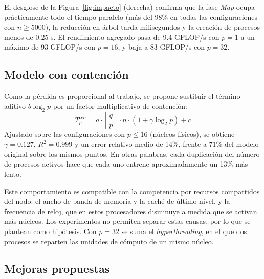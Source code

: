 \documentclass[11pt, a4paper]{article}
\begin{document}
El desglose de la Figura~\ref{fig:impacto} (derecha) confirma que la fase \textit{Map} ocupa prácticamente todo el tiempo paralelo (más del 98\% en todas las configuraciones con $n \geq 5000$), la reducción en árbol tarda milisegundos y la creación de procesos menos de 0.25 s. El rendimiento agregado pasa de 9.4 GFLOP/s con $p = 1$ a un máximo de 93 GFLOP/s con $p = 16$, y baja a 83 GFLOP/s con $p = 32$.

\subsection{Modelo con contención}

Como la pérdida es proporcional al trabajo, se propone sustituir el término aditivo $b \log_2 p$ por un factor multiplicativo de contención:
$$T_p^{teo} = a \cdot \left\lceil \frac{q}{p} \right\rceil \cdot n \cdot (1 + \gamma \log_2 p) + c$$
Ajustado sobre las configuraciones con $p \leq 16$ (núcleos físicos), se obtiene $\gamma = 0.127$, $R^2 = 0.999$ y un error relativo medio de 14\%, frente a 71\% del modelo original sobre los mismos puntos. En otras palabras, cada duplicación del número de procesos activos hace que cada uno entrene aproximadamente un 13\% más lento.

Este comportamiento es compatible con la competencia por recursos compartidos del nodo: el ancho de banda de memoria y la caché de último nivel, y la frecuencia de reloj, que en estos procesadores disminuye a medida que se activan más núcleos. Los experimentos no permiten separar estas causas, por lo que se plantean como hipótesis. Con $p = 32$ se suma el \textit{hyperthreading}, en el que dos procesos se reparten las unidades de cómputo de un mismo núcleo.

\subsection{Mejoras propuestas}
\end{document}
